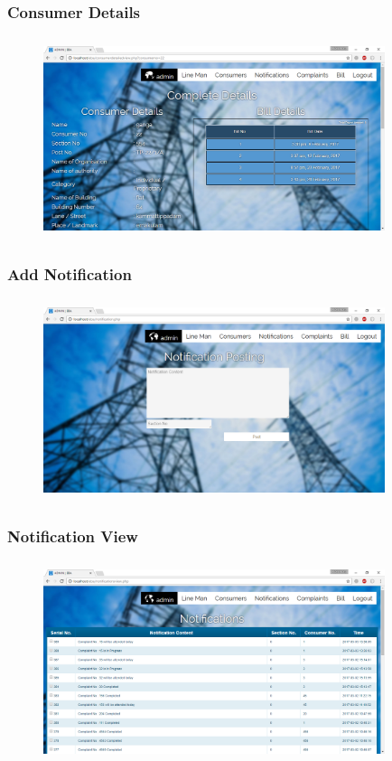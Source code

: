 \documentclass{beamer} %
\theoremstyle{definition} %
\begin{document}
\begin{frame}
\frametitle{Consumer Details}
\begin{figure}[center]
\includegraphics[width=10cm ,height=5.9cm]{consumerdetails.png} 
\end{figure}
\end{frame}

\begin{frame}
\frametitle{Add Notification}
\begin{figure}[center]
\includegraphics[width=10cm ,height=5.9cm]{notificationadd.png} 
\end{figure}
\end{frame}

\begin{frame}
\frametitle{Notification View}
\begin{figure}[center]
\includegraphics[width=10cm ,height=5.9cm]{notificationview.png} 
\end{figure}
\end{frame}
\end{document}
